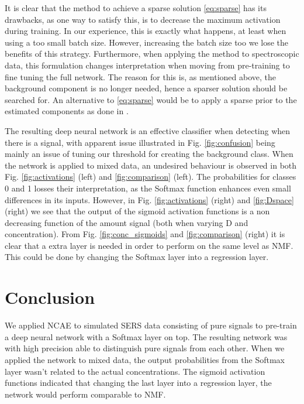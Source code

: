 \documentclass{article}
\begin{document}
It is clear that the method to achieve a sparse solution \eqref{eq:sparse} has its drawbacks, as one way to satisfy this, is to decrease the maximum activation during training. In our experience, this is exactly what happens, at least when using a too small batch size. However, increasing the batch size too we lose the benefits of this strategy. Furthermore, when applying the method to spectroscopic data, this formulation changes interpretation when moving from pre-training to fine tuning the full network. The reason for this is, as mentioned above, the background component is no longer needed, hence a sparser solution should be searched for. An alternative to \eqref{eq:sparse} would be to apply a sparse prior to the estimated components as done in \cite{snmf2006,ramanSNMF2014}.

The resulting deep neural network is an effective classifier when detecting when there is a signal, with apparent issue illustrated in Fig. \ref{fig:confusion} being mainly an issue of tuning our threshold for creating the background class. When the network is applied to mixed data, an undesired behaviour is observed in both Fig. \ref{fig:activations} (left) and \ref{fig:comparison} (left). The probabilities for classes 0 and 1 losses their interpretation, as the Softmax function enhances even small differences in its inputs. However, in Fig. \ref{fig:activations} (right) and \ref{fig:Dspace} (right) we see that the output of the sigmoid activation functions is a non decreasing function of the amount signal (both when varying D and concentration). From Fig. \ref{fig:conc_sigmoids} and \ref{fig:comparison} (right) it is clear that a extra layer is needed in order to perform on the same level as NMF. This could be done by changing the Softmax layer into a regression layer.



\section{Conclusion}
\label{sec:conclusion}
We applied NCAE to simulated SERS data consisting of pure signals to pre-train a deep neural network with a Softmax layer on top. The resulting network was with high precision able to distinguish pure signals from each other. When we applied the network to mixed data, the output probabilities from the Softmax layer wasn't related to the actual concentrations. The sigmoid activation functions indicated that changing the last layer into a regression layer, the network would perform comparable to NMF.
\end{document}
